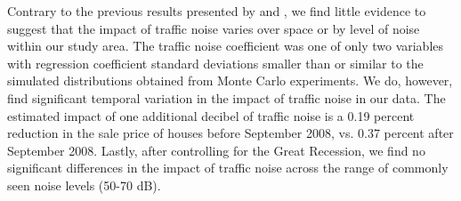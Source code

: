 \documentclass{article}\usepackage{graphicx, color}
\begin{document}
Contrary to the previous results presented by \citet{MarmolejoDuarteCarlos;GonzalezTamez2009} and \citet{Theebe2004a}, we find little evidence to suggest that the impact of traffic noise varies over space or by level of noise within our study area. The traffic noise coefficient was one of only two variables with regression coefficient standard deviations smaller than or similar to the simulated distributions obtained from Monte Carlo experiments. We do, however, find significant temporal variation in the impact of traffic noise in our data. The estimated impact of one additional decibel of traffic noise is a 0.19 percent reduction in the sale price of houses before September 2008, vs. 0.37 percent after September 2008. Lastly, after controlling for the Great Recession, we find no significant differences in the impact of traffic noise across the range of commonly seen noise levels (50-70 dB).





\end{document}
